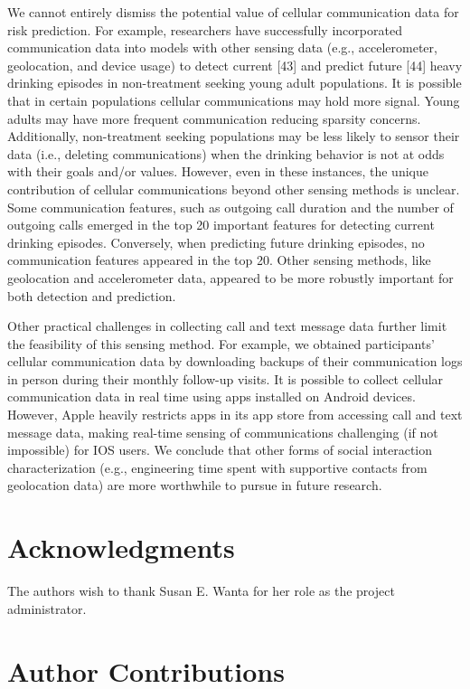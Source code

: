 \documentclass[
  letterpaper,
  DIV=11,
  numbers=noendperiod]{scrartcl}
\begin{document}
We cannot entirely dismiss the potential value of cellular communication
data for risk prediction. For example, researchers have successfully
incorporated communication data into models with other sensing data
(e.g., accelerometer, geolocation, and device usage) to detect current
{[}43{]} and predict future {[}44{]} heavy drinking episodes in
non-treatment seeking young adult populations. It is possible that in
certain populations cellular communications may hold more signal. Young
adults may have more frequent communication reducing sparsity concerns.
Additionally, non-treatment seeking populations may be less likely to
sensor their data (i.e., deleting communications) when the drinking
behavior is not at odds with their goals and/or values. However, even in
these instances, the unique contribution of cellular communications
beyond other sensing methods is unclear. Some communication features,
such as outgoing call duration and the number of outgoing calls emerged
in the top 20 important features for detecting current drinking
episodes. Conversely, when predicting future drinking episodes, no
communication features appeared in the top 20. Other sensing methods,
like geolocation and accelerometer data, appeared to be more robustly
important for both detection and prediction.

Other practical challenges in collecting call and text message data
further limit the feasibility of this sensing method. For example, we
obtained participants' cellular communication data by downloading
backups of their communication logs in person during their monthly
follow-up visits. It is possible to collect cellular communication data
in real time using apps installed on Android devices. However, Apple
heavily restricts apps in its app store from accessing call and text
message data, making real-time sensing of communications challenging (if
not impossible) for IOS users. We conclude that other forms of social
interaction characterization (e.g., engineering time spent with
supportive contacts from geolocation data) are more worthwhile to pursue
in future research.

\section{Acknowledgments}\label{acknowledgments}

The authors wish to thank Susan E. Wanta for her role as the project
administrator.

\section{Author Contributions}\label{author-contributions}
\end{document}
